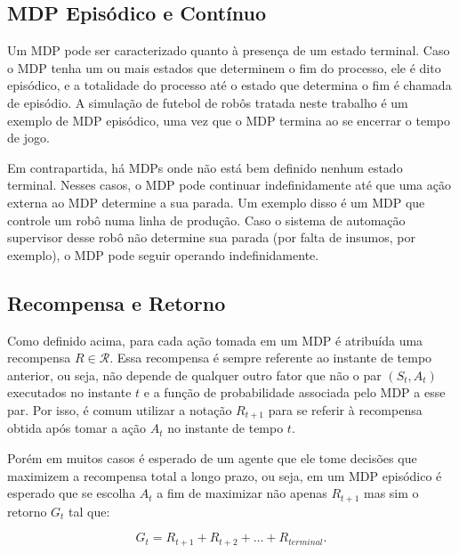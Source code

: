 \subsection{MDP Episódico e Contínuo}

Um MDP pode ser caracterizado quanto à presença de um estado terminal. Caso o MDP tenha um ou mais estados que determinem o fim do processo, ele é dito episódico, e a totalidade do processo até o estado que determina o fim é chamada de episódio. A simulação de futebol de robôs tratada neste trabalho é um exemplo de MDP episódico, uma vez que o MDP termina ao se encerrar o tempo de jogo.

Em contrapartida, há MDPs onde não está bem definido nenhum estado terminal. Nesses casos, o MDP pode continuar indefinidamente até que uma ação externa ao MDP determine a sua parada. Um exemplo disso é um MDP que controle um robô numa linha de produção. Caso o sistema de automação supervisor desse robô não determine sua parada (por falta de insumos, por exemplo), o MDP pode seguir operando indefinidamente.


\subsection{Recompensa e Retorno}

Como definido acima, para cada ação tomada em um MDP é atribuída uma recompensa $R \in \mathcal{R}$. Essa recompensa é sempre referente ao instante de tempo anterior, ou seja, não depende de qualquer outro fator que não o par $(S_t, A_t)$ executados no instante $t$ e a função de probabilidade associada pelo MDP a esse par. Por isso, é comum utilizar a notação $R_{t+1}$ para se referir à recompensa obtida após tomar a ação $A_t$ no instante de tempo $t$.

Porém em muitos casos é esperado de um agente que ele tome decisões que maximizem a recompensa total a longo prazo, ou seja, em um MDP episódico é esperado que se escolha $A_t$ a fim de maximizar não apenas $R_{t+1}$ mas sim o retorno $G_{t}$ tal que:

\begin{equation}
G_{t} = R_{t+1} + R_{t+2} + \dotsc + R_{terminal}.
\end{equation}

